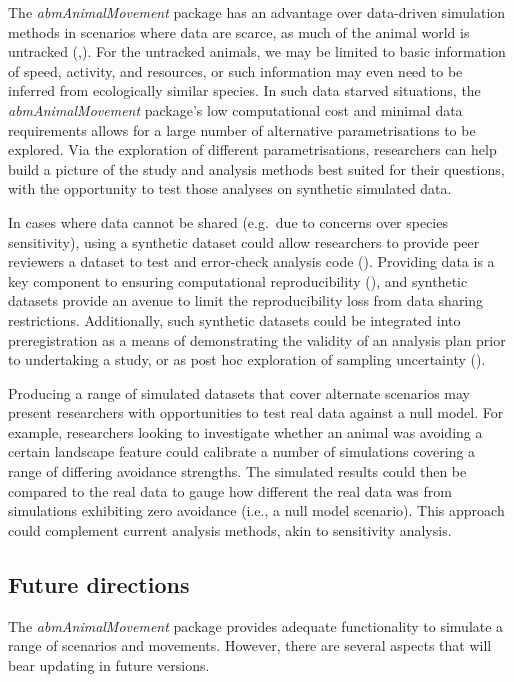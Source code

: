 \documentclass[10pt,a4paper]{article}
\begin{document}
The \emph{abmAnimalMovement} package has an advantage over data-driven simulation methods in scenarios where data are scarce, as much of the animal world is untracked (,).
For the untracked animals, we may be limited to basic information of speed, activity, and resources, or such information may even need to be inferred from ecologically similar species.
In such data starved situations, the \emph{abmAnimalMovement} package's low computational cost and minimal data requirements allows for a large number of alternative parametrisations to be explored.
Via the exploration of different parametrisations, researchers can help build a picture of the study and analysis methods best suited for their questions, with the opportunity to test those analyses on synthetic simulated data.

In cases where data cannot be shared (e.g.~due to concerns over species sensitivity), using a synthetic dataset could allow researchers to provide peer reviewers a dataset to test and error-check analysis code ().
Providing data is a key component to ensuring computational reproducibility (), and synthetic datasets provide an avenue to limit the reproducibility loss from data sharing restrictions.
Additionally, such synthetic datasets could be integrated into preregistration as a means of demonstrating the validity of an analysis plan prior to undertaking a study, or as post hoc exploration of sampling uncertainty ().

Producing a range of simulated datasets that cover alternate scenarios may present researchers with opportunities to test real data against a null model.
For example, researchers looking to investigate whether an animal was avoiding a certain landscape feature could calibrate a number of simulations covering a range of differing avoidance strengths.
The simulated results could then be compared to the real data to gauge how different the real data was from simulations exhibiting zero avoidance (i.e., a null model scenario).
This approach could complement current analysis methods, akin to sensitivity analysis.

\subsection{Future directions}\label{future-directions}

The \emph{abmAnimalMovement} package provides adequate functionality to simulate a range of scenarios and movements.
However, there are several aspects that will bear updating in future versions.
\end{document}
